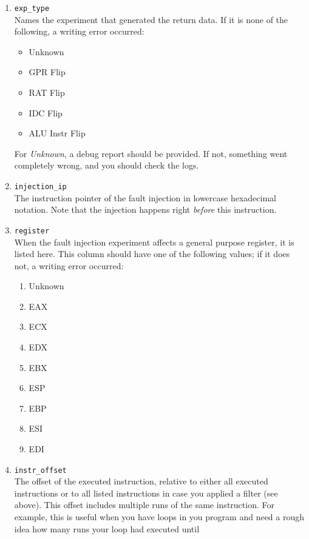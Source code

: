 \documentclass[a4paper,10pt]{article}
\begin{document}
\begin{enumerate}
 \item \verb+exp_type+\\
       Names the experiment that generated the return data.
       If it is none of the following, a writing error occurred:
       \begin{itemize}
        \item Unknown
        \item GPR Flip
        \item RAT Flip
        \item IDC Flip
        \item ALU Instr Flip
       \end{itemize}
       For \emph{Unknown}, a debug report should be provided.
       If not, something went completely wrong, and you should
       check the logs.
 \item \verb+injection_ip+\\
       The instruction pointer of the fault injection
       in lowercase hexadecimal notation.
       Note that the injection happens right \emph{before} this
       instruction.
 \item \verb+register+\\
       When the fault injection experiment affects a general purpose register,
       it is listed here. This column should have one of the following values;
       if it does not, a writing error occurred:
       \begin{enumerate}
        \item Unknown
        \item EAX
        \item ECX
        \item EDX
        \item EBX
        \item ESP
        \item EBP
        \item ESI
        \item EDI
       \end{enumerate}
 \item \verb+instr_offset+\\
       The offset of the executed instruction, relative to either all executed
       instructions or to all listed instructions in case you applied
       a filter (see above). This offset includes multiple runs of the same
       instruction.
       For example, this is useful when you have loops in you program and
       need a rough idea how many runs your loop had executed until

\end{enumerate}
\end{document}
